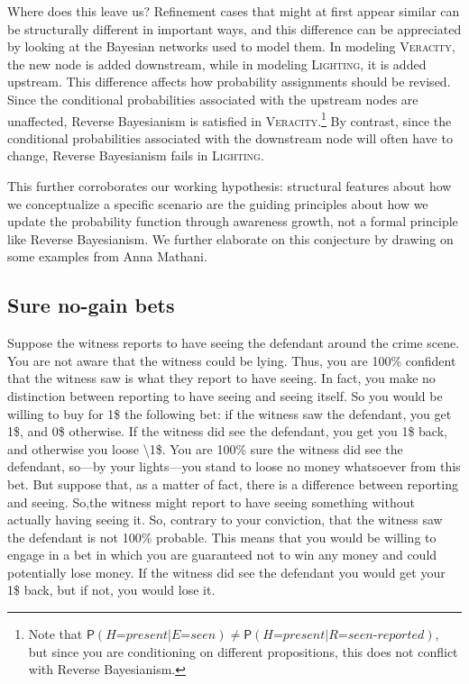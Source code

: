 \documentclass[
  11pt,
  dvipsnames,enabledeprecatedfontcommands]{scrartcl}
\newcommand{\pr}[1]{\ensuremath{\mathsf{P}(#1)}}
\begin{document}
Where does this leave us? Refinement cases that might at first appear
similar can be structurally different in important ways, and this
difference can be appreciated by looking at the Bayesian networks used
to model them. In modeling \textsc{Veracity}, the new node is added
downstream, while in modeling \textsc{Lighting}, it is added upstream.
This difference affects how probability assignments should be revised.
Since the conditional probabilities associated with the upstream nodes
are unaffected, Reverse Bayesianism is satisfied in
\textsc{Veracity}.\footnote{Note that
  \(\pr{\textit{H=present}\vert \textit{E=seen}}\neq \pr{\textit{H=present}\vert \textit{R=seen-reported}}\),
  but since you are conditioning on different propositions, this does
  not conflict with Reverse Bayesianism.} By contrast, since the
conditional probabilities associated with the downstream node will often
have to change, Reverse Bayesianism fails in \textsc{Lighting}.

This further corroborates our working hypothesis: structural features
about how we conceptualize a specific scenario are the guiding
principles about how we update the probability function through
awareness growth, not a formal principle like Reverse Bayesianism. We
further elaborate on this conjecture by drawing on some examples from
Anna Mathani.

\hypertarget{sure-no-gain-bets}{%
\subsection{Sure no-gain bets}\label{sure-no-gain-bets}}

Suppose the witness reports to have seeing the defendant around the
crime scene. You are not aware that the witness could be lying. Thus,
you are 100\% confident that the witness saw is what they report to have
seeing. In fact, you make no distinction between reporting to have
seeing and seeing itself. So you would be willing to buy for 1\$ the
following bet: if the witness saw the defendant, you get 1\$, and 0\$
otherwise. If the witness did see the defendant, you get you 1\$ back,
and otherwise you loose \textbackslash1\$. You are 100\% sure the
witness did see the defendant, so---by your lights---you stand to loose
no money whatsoever from this bet. But suppose that, as a matter of
fact, there is a difference between reporting and seeing. So,the witness
might report to have seeing something without actually having seeing it.
So, contrary to your conviction, that the witness saw the defendant is
not 100\% probable. This means that you would be willing to engage in a
bet in which you are guaranteed not to win any money and could
potentially lose money. If the witness did see the defendant you would
get your 1\$ back, but if not, you would lose it.
\end{document}
